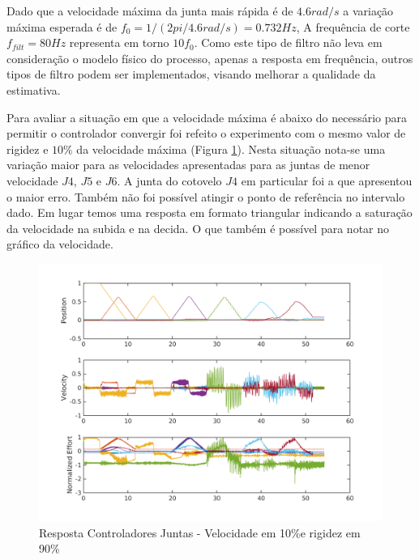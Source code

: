 
Dado que a velocidade máxima da junta mais rápida é de $4.6 rad/s$ a variação máxima esperada é de $f_0 = 1/(2pi/4.6 rad/s) = 0.732 Hz$, A frequência de corte $f_{filt} = 80Hz$ representa em torno $10 f_0$. Como este tipo de filtro não leva em consideração o modelo físico do processo, apenas a resposta em frequência, outros tipos de filtro podem ser implementados, visando melhorar a qualidade da estimativa.

Para avaliar a situação em que a velocidade máxima é abaixo do necessário para permitir o controlador convergir foi refeito o experimento com o mesmo valor de rigidez e $10\%$ da velocidade máxima (Figura \ref{fig:jointIdentificationSpeed10p_stiff90p2}). Nesta situação nota-se uma variação maior para as velocidades apresentadas para as juntas de menor velocidade $J4$, $J5$ e $J6$. A junta do cotovelo $J4$ em particular foi a que apresentou o maior erro. Também não foi possível atingir o ponto de referência no intervalo dado. Em lugar temos uma resposta em formato triangular indicando a saturação da velocidade na subida e na decida. O que também é possível para notar no gráfico da velocidade.

\begin{figure}[H]
    \centering
    \includegraphics[width = \linewidth]{tex/figs/jointIdentificationSpeed10p_stiff90p2.png}
    \caption{Resposta Controladores Juntas - Velocidade em 10\%e rigidez em 90\%}
    \label{fig:jointIdentificationSpeed10p_stiff90p2}
\end{figure}

